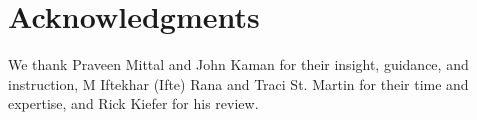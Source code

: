 \documentclass{proc}
\begin{document}
\section{Acknowledgments}
We thank Praveen Mittal and John Kaman for their insight, guidance, and instruction, M Iftekhar (Ifte) Rana and Traci St. Martin for their time and expertise, and Rick Kiefer for his review.






\end{document}
